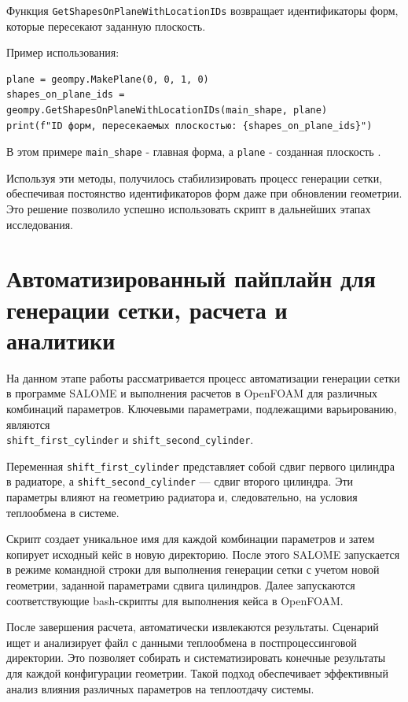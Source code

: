 \documentclass[a4paper,12pt]{extreport}
\numberwithin{equation}{chapter}
\begin{document}
Функция \texttt{GetShapesOnPlaneWithLocationIDs} возвращает идентификаторы форм, которые пересекают заданную плоскость.

Пример использования:
\begin{verbatim}
plane = geompy.MakePlane(0, 0, 1, 0)
shapes_on_plane_ids = geompy.GetShapesOnPlaneWithLocationIDs(main_shape, plane)
print(f"ID форм, пересекаемых плоскостью: {shapes_on_plane_ids}")
\end{verbatim}

В этом примере \texttt{main\_shape} - главная форма, а \texttt{plane} - созданная плоскость \cite{salome_doc}.

Используя эти методы, получилось стабилизировать процесс генерации сетки, обеспечивая постоянство идентификаторов форм даже при обновлении геометрии. Это решение позволило успешно использовать скрипт в дальнейших этапах исследования.

\section{Автоматизированный пайплайн для генерации сетки, расчета и аналитики}

На данном этапе работы рассматривается процесс автоматизации генерации сетки в программе SALOME и выполнения расчетов в OpenFOAM для различных комбинаций параметров. Ключевыми параметрами, подлежащими варьированию, являются \\ \texttt{shift\_first\_cylinder} и \texttt{shift\_second\_cylinder}.

Переменная \texttt{shift\_first\_cylinder} представляет собой сдвиг первого цилиндра в радиаторе, а \texttt{shift\_second\_cylinder} — сдвиг второго цилиндра. Эти параметры влияют на геометрию радиатора и, следовательно, на условия теплообмена в системе.

Скрипт создает уникальное имя для каждой комбинации параметров и затем копирует исходный кейс в новую директорию. После этого SALOME запускается в режиме командной строки для выполнения генерации сетки с учетом новой геометрии, заданной параметрами сдвига цилиндров. Далее запускаются соответствующие bash-скрипты для выполнения кейса в OpenFOAM.

После завершения расчета, автоматически извлекаются результаты. Сценарий ищет и анализирует файл с данными теплообмена в постпроцессинговой директории. Это позволяет собирать и систематизировать конечные результаты для каждой конфигурации геометрии. Такой подход обеспечивает эффективный анализ влияния различных параметров на теплоотдачу системы.
\end{document}
